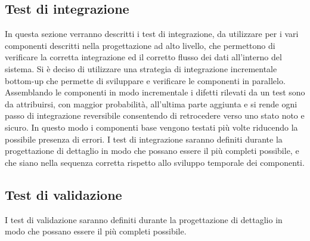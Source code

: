 \subsection{Test di integrazione}
In questa sezione verranno descritti i test di integrazione, da utilizzare per i vari componenti descritti nella progettazione ad alto livello, che permettono di verificare la corretta integrazione ed il corretto flusso dei dati all’interno del sistema.
Si è deciso di utilizzare una strategia di integrazione incrementale bottom-up che permette di sviluppare e verificare le componenti in parallelo.\\
Assemblando le componenti in modo incrementale i difetti rilevati da un test sono da
attribuirsi, con maggior probabilità, all’ultima parte aggiunta e si rende ogni passo di
integrazione reversibile consentendo di retrocedere verso uno stato noto e sicuro.
In questo modo i componenti base vengono testati più volte riducendo la possibile presenza di errori.
I test di integrazione saranno definiti durante la progettazione di dettaglio in modo che possano essere il più completi possibile, e che siano nella sequenza corretta rispetto allo sviluppo temporale dei componenti.
\subsection{Test di validazione}
I test di validazione saranno definiti durante la progettazione di dettaglio in modo che possano essere il più completi possibile.

